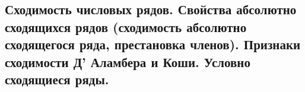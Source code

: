 \subsection{Сходимость числовых рядов. Свойства абсолютно сходящихся рядов (сходимость абсолютно сходящегося ряда, престановка членов). Признаки сходимости Д' Аламбера и Коши. Условно сходящиеся ряды. }